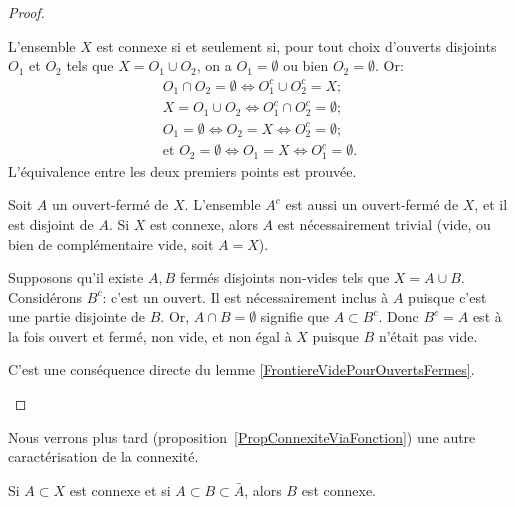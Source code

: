 \begin{proof}
  \begin{subproof}
    \item[\ref{ITEMooNIPZooIDPmEc}$\Leftrightarrow$\ref{ITEMooNIPZooIDPmEf}:]
      L'ensemble \( X \)  est connexe si et seulement si, pour tout choix d'ouverts disjoints \(O_1 \) et \(O_2\) tels que \(X = O_1 \cup O_2 \), on a \( O_1 = \emptyset \) ou bien \( O_2 = \emptyset \). Or:
      \begin{gather}
        O_1 \cap O_2 = \emptyset \Longleftrightarrow O_1^c \cup O_2^c = X;\\
        X = O_1 \cup O_2 \Longleftrightarrow O_1^c \cap O_2^c = \emptyset;\\
        O_1 = \emptyset \Leftrightarrow O_2 = X \Leftrightarrow O_2^c = \emptyset;\\
        \text{et } O_2 = \emptyset \Leftrightarrow O_1 = X
        \Leftrightarrow O_1^c = \emptyset.
    \end{gather}
    L'équivalence entre les deux premiers points est prouvée.

  \item[\ref{ITEMooNIPZooIDPmEc}$\Leftarrow$\ref{ITEMooNIPZooIDPmEf}:]
    Soit \(A \) un ouvert-fermé de \(X\). L'ensemble \(A^c\) est aussi un ouvert-fermé de \(X\), et il est disjoint de \( A\). Si \( X \) est connexe, alors \( A \) est nécessairement trivial (vide, ou bien de complémentaire vide, soit \( A = X \)).

  \item[non \ref{ITEMooNIPZooIDPmEd}$\Leftarrow$non \ref{ITEMooNIPZooIDPmEf}:]
    Supposons qu'il existe \( A, B\) fermés disjoints non-vides tels que \(X = A \cup B\). Considérons \( B^c \): c'est un ouvert. Il est nécessairement inclus à \( A \) puisque c'est une partie disjointe de \(B \). Or, \( A \cap B = \emptyset \) signifie que \( A \subset B^c \). Donc \( B^c = A \) est à la fois ouvert et fermé, non vide, et non égal à \(X \) puisque \( B \) n'était pas vide.

    \item[ \ref{ITEMooNIPZooIDPmEf}$\Leftrightarrow$ \ref{ITEMooNIPZooIDPmEe}]
      C'est une conséquence directe du lemme \ref{FrontiereVidePourOuvertsFermes}.
  \end{subproof}
\end{proof}


Nous verrons plus tard (proposition~\ref{PropConnexiteViaFonction}) une autre caractérisation de la connexité.

\begin{proposition}
    Si \( A\subset X\) est connexe et si \( A\subset B\subset \bar A\), alors \( B\) est connexe.
\end{proposition}


